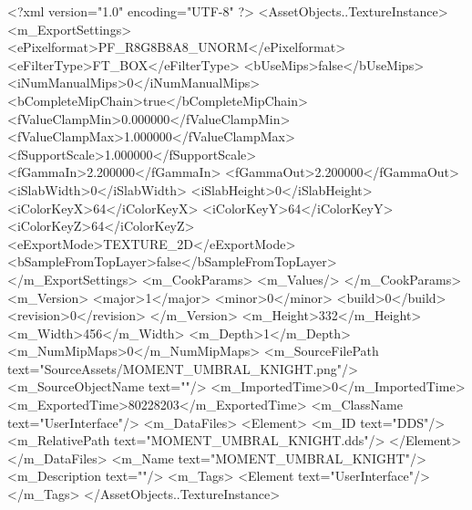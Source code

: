 <?xml version="1.0" encoding="UTF-8" ?>
<AssetObjects..TextureInstance>
	<m_ExportSettings>
		<ePixelformat>PF_R8G8B8A8_UNORM</ePixelformat>
		<eFilterType>FT_BOX</eFilterType>
		<bUseMips>false</bUseMips>
		<iNumManualMips>0</iNumManualMips>
		<bCompleteMipChain>true</bCompleteMipChain>
		<fValueClampMin>0.000000</fValueClampMin>
		<fValueClampMax>1.000000</fValueClampMax>
		<fSupportScale>1.000000</fSupportScale>
		<fGammaIn>2.200000</fGammaIn>
		<fGammaOut>2.200000</fGammaOut>
		<iSlabWidth>0</iSlabWidth>
		<iSlabHeight>0</iSlabHeight>
		<iColorKeyX>64</iColorKeyX>
		<iColorKeyY>64</iColorKeyY>
		<iColorKeyZ>64</iColorKeyZ>
		<eExportMode>TEXTURE_2D</eExportMode>
		<bSampleFromTopLayer>false</bSampleFromTopLayer>
	</m_ExportSettings>
	<m_CookParams>
		<m_Values/>
	</m_CookParams>
	<m_Version>
		<major>1</major>
		<minor>0</minor>
		<build>0</build>
		<revision>0</revision>
	</m_Version>
	<m_Height>332</m_Height>
	<m_Width>456</m_Width>
	<m_Depth>1</m_Depth>
	<m_NumMipMaps>0</m_NumMipMaps>
	<m_SourceFilePath text="SourceAssets/MOMENT_UMBRAL_KNIGHT.png"/>
	<m_SourceObjectName text=""/>
	<m_ImportedTime>0</m_ImportedTime>
	<m_ExportedTime>80228203</m_ExportedTime>
	<m_ClassName text="UserInterface"/>
	<m_DataFiles>
		<Element>
			<m_ID text="DDS"/>
			<m_RelativePath text="MOMENT_UMBRAL_KNIGHT.dds"/>
		</Element>
	</m_DataFiles>
	<m_Name text="MOMENT_UMBRAL_KNIGHT"/>
	<m_Description text=""/>
	<m_Tags>
		<Element text="UserInterface"/>
	</m_Tags>
</AssetObjects..TextureInstance>

